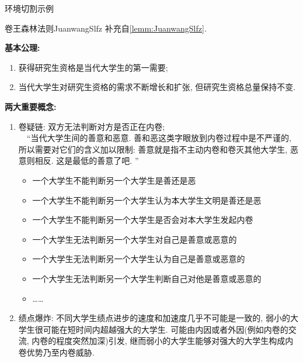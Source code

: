 \documentclass[hyperref,UTF8,11pt,CJK]{beamer}
\begin{document}
\begin{frame}{环境切割示例}
	\begin{scuremark}{卷王森林法则}{JuanwangSlfz}
		补充自\vref{lemm:JuanwangSlfz}.\par
		\textbf{\color{JXred}基本公理:}
		\begin{enumerate}
			\item 获得研究生资格是当代大学生的第一需要;
			\item 当代大学生对研究生资格的需求不断增长和扩张, 但研究生资格总量保持不变.
		\end{enumerate}
		\textbf{\color{JXred}两大重要概念:}
		\begin{enumerate}
			\item 卷疑链: 双方无法判断对方是否正在内卷;\\
			~~“当代大学生间的善意和恶意. 善和恶这类字眼放到内卷过程中是不严谨的, 所以需要对它们的含义加以限制: 善意就是指不主动内卷和卷灭其他大学生, 恶意则相反. 这是最低的善意了吧. ”
			\begin{itemize}
				\item 一个大学生不能判断另一个大学生是善还是恶
				\item 一个大学生不能判断另一个大学生认为本大学生文明是善还是恶
				\item 一个大学生不能判断另一个大学生是否会对本大学生发起内卷
				\item 一个大学生无法判断另一个大学生对自己是善意或恶意的
				\item 一个大学生无法判断另一个大学生认为自己是善意或恶意的
				\item 一个大学生无法判断另一个大学生判断自己对他是善意或恶意的
				\item \dots\dots
			\end{itemize}	
			\item 绩点爆炸: 不同大学生绩点进步的速度和加速度几乎不可能是一致的, 弱小的大学生很可能在短时间内超越强大的大学生. 可能由内因或者外因(例如内卷的交流, 内卷的程度突然加深)引发, 继而弱小的大学生能够对强大的大学生构成内卷优势乃至内卷威胁.
		\end{enumerate}
	\end{scuremark}
\end{frame}
\end{document}
